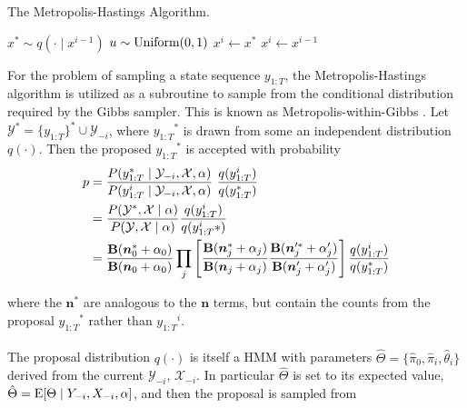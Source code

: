 \documentclass[12pt]{report}
\newcommand{\p}[0]{\prime}
\newcommand{\E}[0]{\text{\textnormal{E}}}
\newcommand{\1}[0]{\mathbbm{1}}
\newcommand{\Unif}[0]{\textnormal{Uniform}}
\newcommand{\Bf}[0]{\text{\textbf{B}}}
\newcommand{\seq}[3]{\ensuremath{#1_{{#2}:{#3}}}}
\begin{document}
\begin{algorithm}[H]
    \caption{The Metropolis-Hastings Algorithm.\label{alg:mh-generic}}
    \begin{algorithmic}[1]
            \State $x^* \sim q(\cdot \mid x^{i-1})$
            \State $u \sim \Unif(0, 1)$
                \State $x^i \gets x^*$
            \Else
                \State $x^i \gets x^{i-1}$
            \EndIf
        \EndFor
        \State {}
    \end{algorithmic}
\end{algorithm}

For the problem of sampling a state sequence $\seq{y}{1}{T}$, the Metropolis-Hastings algorithm
is utilized as a subroutine to sample from the conditional distribution required
by the Gibbs sampler. This is known as Metropolis-within-Gibbs \cite{mh-within-gibbs}. 
Let $\mathcal{Y}^* = \{\seq{y}{1}{T}\}^* \cup \mathcal{Y}_{-i}$, 
where $\seq{y}{1}{T}^*$ is drawn from some an independent distribution $q(\cdot)$. 
Then the proposed $\seq{y}{1}{T}^*$ is accepted with probability
\begin{align}
    p
    &= \frac{P(\seq{y}{1}{T}^* \mid \mathcal{Y}_{-i}, \mathcal{X}, \alpha)}
            {P(\seq{y}{1}{T}^i \mid \mathcal{Y}_{-i}, \mathcal{X}, \alpha)} \
            \frac{q(\seq{y}{1}{T}^i)}{q(\seq{y}{1}{T}^*)} \nonumber \\
    &= \frac{P(\mathcal{Y}^*, \mathcal{X} \mid \alpha)}
            {P(\mathcal{Y}, \mathcal{X} \mid \alpha)}
            \frac{q(\seq{y}{1}{T}^i)}{q(\seq{y}{1}{T}^i*)} \nonumber \\
    &= \frac{\Bf(\bm{n}_0^* + \alpha_0)}
            {\Bf(\bm{n}_0 + \alpha_0)} 
    \prod_j \left[ \frac{\Bf(\bm{n}_j^* + \alpha_j)}
                        {\Bf(\bm{n}_j + \alpha_j)} 
                   \frac{\Bf(\bm{n}_j^{\prime *} + \alpha_j^\p)}
                        {\Bf(\bm{n}_j^\p + \alpha_j^\p)}\right] 
                   \frac{q(\seq{y}{1}{T}^i)}{q(\seq{y}{1}{T}^*)} \label{eq:mh-hmm-prob-accept}
\end{align}

where the $\bm{n}^*$ are analogous to the $\bm{n}$ terms, but contain the 
counts from the proposal $\seq{y}{1}{T}^*$ rather than $\seq{y}{1}{T}^i$.
\\\\
The proposal distribution $q(\cdot)$ is itself a \ac{HMM} with parameters 
$\hat{\Theta} = \{\hat{\pi}_0, \hat{\pi}_i, \hat{\theta}_i\}$ derived from the current 
$\mathcal{Y}_{-i}$, $\mathcal{X}_{-i}$. In particular $\hat{\Theta}$ is set to its expected value,
$\hat{\Theta} = \E[\Theta \mid Y_{-i}, X_{-i}, \alpha]$, and then the proposal is sampled from
\end{document}
